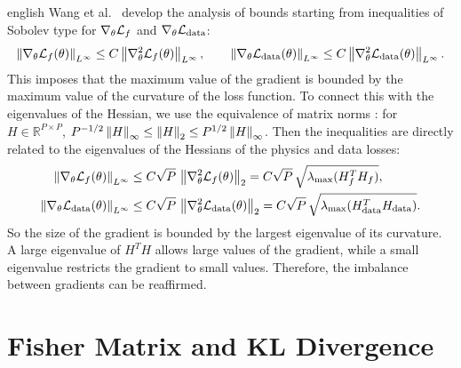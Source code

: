 \begin{hyphenrules}{english}
Wang et al.~\cite{wang2021gradient} develop the analysis of bounds starting from inequalities of Sobolev type
for $\nabla_\theta\mathcal{L}_f$ and $\nabla_\theta\mathcal{L}_{\mathrm{data}}$:
\begin{equation}
  \left\lVert \nabla_\theta\mathcal{L}_f(\theta) \right\rVert_{L^\infty}\le C\left\lVert \nabla^2_\theta\mathcal{L}_f(\theta) \right\rVert_{L^\infty},\qquad
  \left\lVert \nabla_\theta\mathcal{L}_{\mathrm{data}}(\theta) \right\rVert_{L^\infty}\le C\left\lVert \nabla^2_\theta\mathcal{L}_{\mathrm{data}}(\theta) \right\rVert_{L^\infty}.
  \label{eq:grad-bounds}
\end{equation}
This imposes that the maximum value of the gradient is bounded by the maximum value of the curvature of
the loss function. To connect this with the eigenvalues of the Hessian, we use the equivalence of matrix
norms \cite{trefethen1997}: for $H\in\mathbb{R}^{P\times P}$,
$P^{-1/2}\left\lVert H \right\rVert_\infty\le\left\lVert H \right\rVert_2\le P^{1/2}\left\lVert H \right\rVert_\infty$. Then the inequalities are directly related
to the eigenvalues of the Hessians of the physics and data losses:
\begin{align}
  \left\lVert \nabla_\theta\mathcal{L}_f(\theta) \right\rVert_{L^\infty}&\le C\sqrt{P}\,\left\lVert \nabla^2_\theta\mathcal{L}_f(\theta) \right\rVert_{2}
  =C\sqrt{P}\,\sqrt{\lambda_{\max}(H_f^{T}H_f)}, \label{eq:bound-f}\\
  \left\lVert \nabla_\theta\mathcal{L}_{\mathrm{data}}(\theta) \right\rVert_{L^\infty}&\le C\sqrt{P}\,\left\lVert \nabla^2_\theta\mathcal{L}_{\mathrm{data}}(\theta) \right\rVert_{2}
  =C\sqrt{P}\,\sqrt{\lambda_{\max}(H_{\mathrm{data}}^{T}H_{\mathrm{data}})}. \label{eq:bound-data}
\end{align}
So the size of the gradient is bounded by the largest eigenvalue of its curvature. A large eigenvalue of
$H^{T}H$ allows large values of the gradient, while a small eigenvalue restricts the gradient to small
values. Therefore, the imbalance between gradients can be reaffirmed.


\section{Fisher Matrix and KL Divergence}\label{app:fisher}


\end{hyphenrules}
